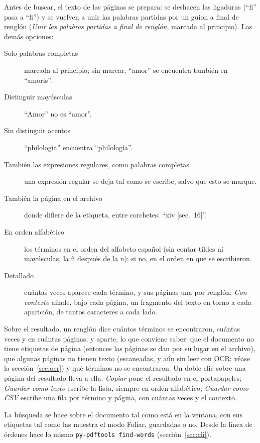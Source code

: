 \documentclass[12pt,
              article,
              oneside
              ]{memoir}
\newcommand*{\menu}[1]{\textit{#1}}
\begin{document}
%
Antes de buscar, el texto de las páginas se prepara: se deshacen las
ligaduras (\enquote{ﬁ} pasa a \enquote{fi}) y se vuelven a unir las palabras
partidas por un guion a final de renglón (\menu{Unir las palabras partidas a
final de renglón}, marcada al principio). Las demás opciones:

\begin{description}
\item[Solo palabras completas] marcada al principio; sin marcar,
  \enquote{amor} se encuentra también en \enquote{amoris}.
\item[Distinguir mayúsculas] \enquote{Amor} no es \enquote{amor}.
\item[Sin distinguir acentos] \enquote{philologia} encuentra
  \enquote{philología}.
\item[También las expresiones regulares, como palabras completas] una
  expresión regular se deja tal como se escribe, salvo que esto se marque.
\item[También la página en el archivo] donde difiere de la etiqueta, entre
  corchetes: \enquote{xiv [sec.~16]}.
\item[En orden alfabético] los términos en el orden del alfabeto español
  (sin contar tildes ni mayúsculas, la ñ después de la n); si no, en el
  orden en que se escribieron.
\item[Detallado] cuántas veces aparece cada término, y sus páginas una por
  renglón; \menu{Con contexto} añade, bajo cada página, un fragmento del
  texto en torno a cada aparición, de tantos caracteres a cada lado.
\end{description}

\noindent Sobre el resultado, un renglón dice cuántos términos se
encontraron, cuántas veces y en cuántas páginas; y aparte, lo que conviene
saber: que el documento no tiene etiquetas de página (entonces las páginas
se dan por su lugar en el archivo), que algunas páginas no tienen texto
(escaneadas, y aún sin leer con OCR: véase la sección~\ref{sec:ocr}) y qué
términos no se encontraron. Un doble clic sobre una página del resultado
lleva a ella. \menu{Copiar} pone el resultado en el portapapeles;
\menu{Guardar como texto} escribe la lista, siempre en orden alfabético;
\menu{Guardar como CSV} escribe una fila por término y página, con cuántas
veces y el contexto.

La búsqueda se hace sobre el documento tal como está en la ventana, con sus
etiquetas tal como las muestra el modo Foliar, guardadas o no. Desde la
línea de órdenes hace lo mismo \texttt{py-pdftools find-words}
(sección~\ref{sec:cli}).
\end{document}
